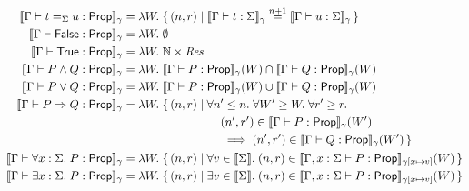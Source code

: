 \begin{align*}
	\Sem{\vctx \proves t =_\sort u : \Prop}_\gamma &=
	\Lam W. \{\, (n, r) \mid \Sem{\vctx \proves t : \sort}_\gamma \nequiv{n+1} \Sem{\vctx \proves u : \sort}_\gamma \,\} \\
	\Sem{\vctx \proves \FALSE : \Prop}_\gamma &= \Lam W. \emptyset \\
	\Sem{\vctx \proves \TRUE : \Prop}_\gamma &= \Lam W. \mathbb{N} \times \textdom{Res} \\
	\Sem{\vctx \proves P \land Q : \Prop}_\gamma &=
	\Lam W. \Sem{\vctx \proves P : \Prop}_\gamma(W) \cap \Sem{\vctx \proves Q : \Prop}_\gamma(W) \\
	\Sem{\vctx \proves P \lor Q : \Prop}_\gamma &=
	\Lam W. \Sem{\vctx \proves P : \Prop}_\gamma(W) \cup \Sem{\vctx \proves Q : \Prop}_\gamma(W) \\
	\Sem{\vctx \proves P \Ra Q : \Prop}_\gamma &=
	\Lam W. \begin{aligned}[t]
		\{\, (n, r) &\mid \All n' \leq n. \All W' \geq W. \All r' \geq r. \\
		&\qquad
		(n', r') \in \Sem{\vctx \proves P : \Prop}_\gamma(W')~ \\
		&\qquad 
		\implies (n', r') \in \Sem{\vctx \proves Q : \Prop}_\gamma(W') \,\}
	\end{aligned} \\
	\Sem{\vctx \proves \All x : \sort. P : \Prop}_\gamma &=
	\Lam W. \{\, (n, r) \mid \All v \in \Sem{\sort}. (n, r) \in \Sem{\vctx, x : \sort \proves P : \Prop}_{\gamma[x \mapsto v]}(W) \,\} \\
	\Sem{\vctx \proves \Exists x : \sort. P : \Prop}_\gamma &=
	\Lam W. \{\, (n, r) \mid \Exists v \in \Sem{\sort}. (n, r) \in \Sem{\vctx, x : \sort \proves P : \Prop}_{\gamma[x \mapsto v]}(W) \,\}
\end{align*}
%
